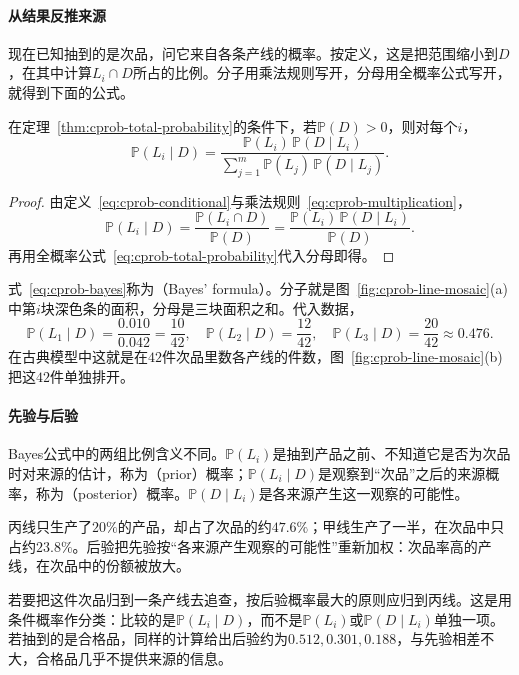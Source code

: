 \paragraph{从结果反推来源}
现在已知抽到的是次品，问它来自各条产线的概率。按定义，这是把范围缩小到$D$，在其中计算$L_i\cap D$所占的比例。分子用乘法规则写开，分母用全概率公式写开，就得到下面的公式。

\begin{theorem}[Bayes公式]
\label{thm:cprob-bayes}
在定理~\ref{thm:cprob-total-probability}的条件下，若$\mathbb{P}(D)>0$，则对每个$i$，
\begin{equation}
 \mathbb{P}(L_i\mid D)=\frac{\mathbb{P}(L_i)\,\mathbb{P}(D\mid L_i)}{\sum_{j=1}^{m}\mathbb{P}(L_j)\,\mathbb{P}(D\mid L_j)}.
 \label{eq:cprob-bayes}
\end{equation}
\end{theorem}

\begin{proof}
由定义~\eqref{eq:cprob-conditional}与乘法规则~\eqref{eq:cprob-multiplication}，
\[
 \mathbb{P}(L_i\mid D)=\frac{\mathbb{P}(L_i\cap D)}{\mathbb{P}(D)}=\frac{\mathbb{P}(L_i)\,\mathbb{P}(D\mid L_i)}{\mathbb{P}(D)}.
\]
再用全概率公式~\eqref{eq:cprob-total-probability}代入分母即得。
\end{proof}

式~\eqref{eq:cprob-bayes}称为（Bayes' formula）。分子就是图~\ref{fig:cprob-line-mosaic}(a)中第$i$块深色条的面积，分母是三块面积之和。代入数据，
\[
 \mathbb{P}(L_1\mid D)=\frac{0.010}{0.042}=\frac{10}{42},\quad
 \mathbb{P}(L_2\mid D)=\frac{12}{42},\quad
 \mathbb{P}(L_3\mid D)=\frac{20}{42}\approx0.476.
\]
在古典模型中这就是在$42$件次品里数各产线的件数，图~\ref{fig:cprob-line-mosaic}(b)把这$42$件单独排开。

\paragraph{先验与后验}
Bayes公式中的两组比例含义不同。$\mathbb{P}(L_i)$是抽到产品之前、不知道它是否为次品时对来源的估计，称为（prior）概率；$\mathbb{P}(L_i\mid D)$是观察到“次品”之后的来源概率，称为（posterior）概率。$\mathbb{P}(D\mid L_i)$是各来源产生这一观察的可能性。

丙线只生产了$20\%$的产品，却占了次品的约$47.6\%$；甲线生产了一半，在次品中只占约$23.8\%$。后验把先验按“各来源产生观察的可能性”重新加权：次品率高的产线，在次品中的份额被放大。

若要把这件次品归到一条产线去追查，按后验概率最大的原则应归到丙线。这是用条件概率作分类：比较的是$\mathbb{P}(L_i\mid D)$，而不是$\mathbb{P}(L_i)$或$\mathbb{P}(D\mid L_i)$单独一项。若抽到的是合格品，同样的计算给出后验约为$0.512,0.301,0.188$，与先验相差不大，合格品几乎不提供来源的信息。


